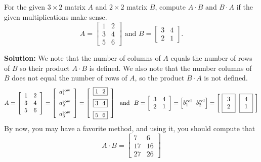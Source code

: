 \begin{example}
\label{ex:MatrixMultiplication04} 
For the given $3 \times 2$ matrix $A$ and $2 \times 2$ matrix $B$, compute $A \cdot B$ and $B \cdot A$ if the given multiplications make sense. 
$$A=\left[\begin{array}{cc} 1 & 2\\
3 & 4 \\ 5 & 6 \end{array}\right] \text{ and } B=\left[\begin{array}{ccc}
 3 &4  \\
2 & 1 \end{array}\right].$$
\end{example}

\textbf{Solution:}
We note that the number of columns of $A$ equals the number of rows of $B$ so their product $A\cdot B$ is defined. We also note that the number columns of $B$ does not equal the number of rows of $A$, so the product $B \cdot A$ is not defined.  
$$A=\left[\begin{array}{cc} 1 & 2\\
3 & 4 \\ 5 & 6 \end{array}\right] =  \left[\begin{array}{c} a_1^{\rm row} \medskip\\
a_2^{\rm row} \medskip \\ a_3^{\rm row} \end{array}\right]  = \left[\begin{array}{c}\boxed{ 1 ~~ 2} \medskip\\
\boxed{3 ~~ 4 } \medskip \\ \boxed{5 ~~ 6 }\end{array}\right]
~~\text{and}~~B=\left[\begin{array}{ccc}
 3 &4  \\
2 & 1 \end{array}\right] = \Big[ b^{\rm col}_1 ~~  b^{\rm col}_2\Big] = \left[~\boxed{\begin{array}{c} 3 \\ 2\end{array} }~~\boxed{\begin{array}{r} 4 \\ 1\end{array} }~ \right]$$
By now, you may have a favorite method, and using it, you should compute that
$$A \cdot B = \left[\begin{array}{cc} 7 & 6\\
17 & 16 \\ 27 & 26 \end{array}\right]$$ \Qed \\ 

